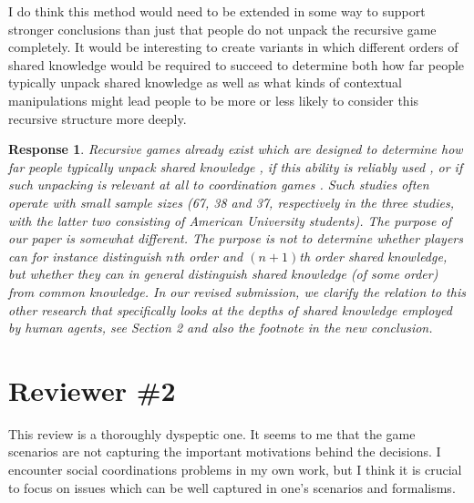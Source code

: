 \documentclass[a4paper]{article}
\newtheorem{response}{Response}
\newenvironment{tobo}{\smallskip \noindent \color{yellow!80!black!80}}{\color{black}\smallskip}
\begin{document}
I do think this method would need to be extended in some way to support stronger conclusions than just that people do not unpack the recursive game completely. It would be interesting to create variants in which different orders of shared knowledge would be required to succeed to determine both how far people typically unpack shared knowledge as well as what kinds of contextual manipulations might lead people to be more or less likely to consider this recursive structure more deeply.

\begin{response} 
Recursive games already exist which are designed to determine how far people typically unpack shared knowledge \cite{flobbe2008children}, if this ability is reliably used \cite{keysar2003limits}, or if such unpacking is relevant at all to  coordination games \cite{curry2012putting}. Such studies often operate with small sample sizes (67, 38 and 37, respectively in the three studies, with the latter two consisting of American University students). The purpose of our paper is somewhat different. The purpose is not to determine whether players can for instance distinguish $n$th order and $(n+1)$th order shared knowledge, but whether they can in general distinguish shared knowledge (of some order) from common knowledge. In our revised submission, we clarify the relation to this other research that specifically looks at the depths of shared knowledge employed by human agents, see Section 2 and also the footnote in the new conclusion. 
\end{response}

\section*{Reviewer \#2}
This review is a thoroughly dyspeptic one. It seems to me that the game scenarios are not capturing the important motivations behind the decisions. I encounter social coordinations problems in my own work, but I think it is crucial to focus on issues which can be well captured in one's scenarios and formalisms.
\end{document}
